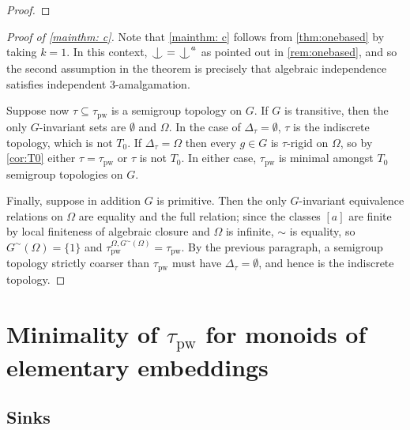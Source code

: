 \documentclass{article}
\theoremstyle{remark}
\theoremstyle{definition}
\newcommand{\pw}[0]{\tau_{\mathrm{pw}}}
\def\Ind#1#2{#1\setbox0=\hbox{$#1x$}\kern\wd0\hbox to 0pt{\hss$#1\mid$\hss}
	\lower.9\ht0\hbox to 0pt{\hss$#1\smile$\hss}\kern\wd0}
\def\ind{\mathop{\mathpalette\Ind{}}}
\newcommand{\gc}[0]{G^{\sim}}
\begin{document}
{{{{{\begin{proof}
   
\end{proof} 




\begin{proof}[Proof of \cref{mainthm: c}]
    Note that \cref{mainthm: c} follows from \cref{thm:onebased} by taking $k=1$. In this context, $\ind=\ind^{a}$ as pointed out in \cref{rem:onebased}, and so the second assumption in the theorem is precisely that algebraic independence satisfies independent $3$-amalgamation. 
    
    Suppose now $\tau\subseteq\pw$ is a semigroup topology on $G$. If $G$ is transitive, then the only $G$-invariant sets are $\emptyset$ and $\Omega$. In the case of $\Delta_\tau=\emptyset$, $\tau$ is the indiscrete topology, which is not $T_{0}$. %
    If $\Delta_{\tau}=\Omega$ then every $g\in G$ is $\tau$-rigid on $\Omega$, so by \cref{cor:T0} either $\tau=\pw$ or $\tau$ is not $T_{0}$. In either case, $\pw$ is minimal amongst  $T_{0}$ semigroup topologies on $G$.

 Finally, suppose in addition $G$ is primitive. Then the only $G$-invariant equivalence relations on $\Omega$ are equality and the full relation; since the classes $[a]$ are finite by local  finiteness of algebraic closure and $\Omega$ is infinite, $\sim$ is equality, so   $\gc(\Omega)=\{1\}$ and $\pw^{\Omega,\gc(\Omega)}=\pw$. By the previous paragraph, a semigroup topology strictly coarser than $\pw$ must have $\Delta_{\tau}=\emptyset$, and  hence is the indiscrete topology.
\end{proof}





\section{Minimality of $\pw$ for monoids of elementary embeddings}
\label{sec:min monoids}



 \subsection{Sinks}
  
  \newcommand{\into}{\hookrightarrow} 

}}}}}
\end{document}
